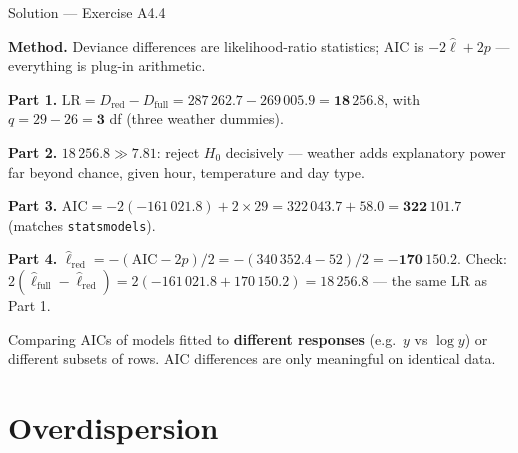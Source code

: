 \documentclass[aspectratio=169,11pt]{beamer}
\begin{document}
\begin{frame}{Solution --- Exercise A4.4}
\begin{solutionbox}
  \textbf{Method.} Deviance differences are likelihood-ratio statistics; AIC is
  $-2\hat\ell + 2p$ --- everything is plug-in arithmetic.

  \textbf{Part 1.} $\text{LR} = D_{\text{red}} - D_{\text{full}}
  = 287\,262.7 - 269\,005.9 = \mathbf{18\,256.8}$, with
  $q = 29 - 26 = \mathbf{3}$ df (three weather dummies).

  \textbf{Part 2.} $18\,256.8 \gg 7.81$: reject $H_0$ decisively --- weather adds
  explanatory power far beyond chance, given hour, temperature and day type.

  \textbf{Part 3.} $\text{AIC} = -2(-161\,021.8) + 2\times 29
  = 322\,043.7 + 58.0 = \mathbf{322\,101.7}$ \checkmark (matches
  \texttt{statsmodels}).

  \textbf{Part 4.} $\hat\ell_{\text{red}} = -(\text{AIC} - 2p)/2
  = -(340\,352.4 - 52)/2 = \mathbf{-170\,150.2}$. Check:
  $2(\hat\ell_{\text{full}} - \hat\ell_{\text{red}})
  = 2(-161\,021.8 + 170\,150.2) = 18\,256.8$ \checkmark --- the same LR as Part 1.
\end{solutionbox}
\begin{mistake}
  Comparing AICs of models fitted to \textbf{different responses} (e.g.\ $y$ vs
  $\log y$) or different subsets of rows. AIC differences are only meaningful on
  identical data.
\end{mistake}
\end{frame}

\section{Overdispersion}
\end{document}
